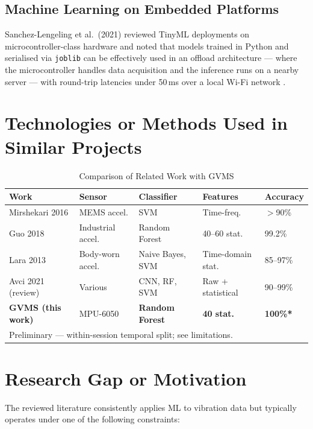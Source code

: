 \documentclass[12pt,a4paper]{report}
\begin{document}
\subsection{Machine Learning on Embedded Platforms}
Sanchez-Lengeling et al.\ (2021) reviewed TinyML deployments on
microcontroller-class hardware and noted that models trained in Python and
serialised via \texttt{joblib} can be effectively used in an offload
architecture --- where the microcontroller handles data acquisition and the
inference runs on a nearby server --- with round-trip latencies under 50\,ms
over a local Wi-Fi network \cite{sanchez2021}.

\section{Technologies or Methods Used in Similar Projects}

\begin{table}[H]
  \centering
  \caption{Comparison of Related Work with GVMS}
  \label{tab:lit_compare}
  \begin{tabularx}{\textwidth}{lXXXX}
    \toprule
    \textbf{Work} & \textbf{Sensor} & \textbf{Classifier} & \textbf{Features} & \textbf{Accuracy} \\
    \midrule
    Mirshekari 2016 & MEMS accel. & SVM & Time-freq. & $>$90\% \\
    Guo 2018 & Industrial accel. & Random Forest & 40--60 stat. & 99.2\% \\
    Lara 2013 & Body-worn accel. & Naive Bayes, SVM & Time-domain stat. & 85--97\% \\
    Avci 2021 (review) & Various & CNN, RF, SVM & Raw + statistical & 90--99\% \\
    \textbf{GVMS (this work)} & MPU-6050 & \textbf{Random Forest} & \textbf{40 stat.} & \textbf{100\%*} \\
    \bottomrule
    \multicolumn{5}{l}{\footnotesize *Preliminary --- within-session temporal split; see limitations.}
  \end{tabularx}
\end{table}

\section{Research Gap or Motivation}

The reviewed literature consistently applies ML to vibration data but
typically operates under one of the following constraints:
\end{document}
